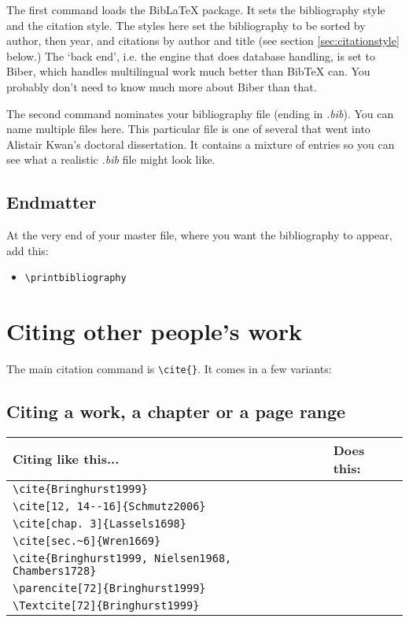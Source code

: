 The first command loads the BibLaTeX package. It sets the bibliography style and the citation style. The styles here set the bibliography to be sorted by author, then year, and citations by author and title (see section \ref{sec:citationstyle} below.) The `back end', i.e. the engine that does database handling, is set to Biber, which handles multilingual work much better than BibTeX can. You probably don't need to know much more about Biber than that.

The second command nominates your bibliography file (ending in \emph{.bib}). You can name multiple files here. This particular file is one of several that went into Alistair Kwan's doctoral dissertation. It contains a mixture of entries so you can see what a realistic \emph{.bib} file might look like.

\subsection{Endmatter}

At the very end of your master file, where you want the bibliography to appear, add this:

\begin{itemize}
\item \verb+\printbibliography+
\end{itemize}


\section{Citing other people's work}

The main citation command is \verb+\cite{}+. It comes in a few variants:

\subsection{Citing a work, a chapter or a page range}
\newlength{\tablecolwidth}
\setlength{\tablecolwidth}{0.5\columnwidth}
\addtolength{\tablecolwidth}{-2\tabcolsep}
\begin{tabular}{p{\tablecolwidth}p{\tablecolwidth}}
\toprule
Citing like this... & Does this: \\
\midrule
\verb+\cite{Bringhurst1999}+ 
	& \cite{Bringhurst1999} \\
\verb+\cite[12, 14--16]{Schmutz2006}+
	& \cite[12, 14--16]{Schmutz2006} \\
\verb+\cite[chap. 3]{Lassels1698}+
	& \cite[chap. 3]{Lassels1698} \\
\verb+\cite[sec.~6]{Wren1669}+ 
	& \cite[sec.~6]{Wren1669} \\
\verb+\cite{+\texttt{Bringhurst1999, Nielsen1968, Chambers1728}\verb+}+ 
	& \cite{Bringhurst1999, Nielsen1968, Chambers1728} \\
\verb+\parencite[72]{Bringhurst1999}+
	& \parencite[72]{Bringhurst1999} \\
\verb+\Textcite[72]{Bringhurst1999}+ 
	& \Textcite[72]{Bringhurst1999} \\
\bottomrule
\end{tabular}


